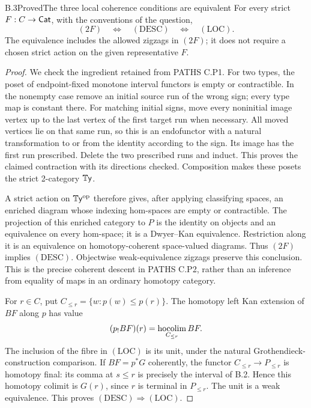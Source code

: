 \begin{claim}{B.3}{Proved}{The three local coherence conditions are equivalent}
\label{B:coherence}
For every strict $F:C\to\mathsf{Cat}$, with the conventions of the
question,
\[
                 (2F)\quad\Longleftrightarrow\quad
                 (\mathrm{DESC})\quad\Longleftrightarrow\quad
                 (\mathrm{LOC}).
\]
The equivalence includes the allowed zigzags in $(2F)$; it does
not require a chosen strict action on the given representative $F$.
\end{claim}
\begin{proof}
We check the ingredient retained from PATHS C.P1. For two types,
the poset of endpoint-fixed monotone interval functors is empty or
contractible. In the nonempty case remove an initial source run
of the wrong sign; every type map is constant there. For matching
initial signs, move every noninitial image vertex up to the last
vertex of the first target run when necessary. All moved vertices
lie on that same run, so this is an endofunctor with a natural
transformation to or from the identity according to the sign.
Its image has the first run prescribed. Delete the two prescribed
runs and induct. This proves the claimed contraction with its
directions checked. Composition makes these posets the strict
2-category $\mathbb{T}\mathsf{y}$.

A strict action on $\mathbb{T}\mathsf{y}^{\mathrm{op}}$ therefore gives, after applying
classifying spaces, an enriched diagram whose indexing
hom-spaces are empty or contractible. The projection of this
enriched category to $P$ is the identity on objects and an
equivalence on every hom-space; it is a Dwyer--Kan equivalence.
Restriction along it is an equivalence on homotopy-coherent
space-valued diagrams. Thus $(2F)$ implies $(\mathrm{DESC})$.
Objectwise weak-equivalence zigzags preserve this conclusion.
This is the precise coherent descent in PATHS C.P2, rather than
an inference from equality of maps in an ordinary homotopy category.

For $r\in C$, put $C_{\leq r}=\{w:p(w)\leq p(r)\}$.
The homotopy left Kan extension of $BF$ along $p$ has value
\[
       (p_!BF)(r)=\operatorname*{hocolim}_{C_{\leq r}}BF.
\]
The inclusion of the fibre in $(\mathrm{LOC})$ is its unit, under
the natural Grothendieck-construction comparison. If $BF=p^*G$
coherently, the functor $C_{\leq r}\to P_{\leq r}$ is homotopy
final: its comma at $s\leq r$ is precisely the interval of B.2.
Hence this homotopy colimit is $G(r)$, since $r$ is terminal in
$P_{\leq r}$. The unit is a weak equivalence. This proves
$(\mathrm{DESC})\Rightarrow(\mathrm{LOC})$.


\end{proof}
